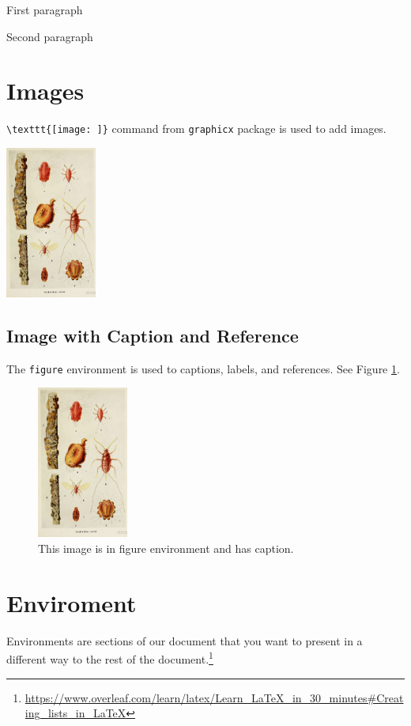 		First paragraph
		
		\noindent Second paragraph
		
\section{Images}

	\verb|\texttt{[image: ]}| command from \verb|graphicx| package is used to add images.
	
	\includegraphics[height=5cm]{./images/Kerria-Lacca}
	
	\subsection{Image with Caption and Reference}
	
		The \verb|figure| environment is used to captions, labels, and references. See Figure \ref{fig1}.
	
		\begin{figure}[h]
			\centering
			\includegraphics[height=5cm]{./images/Kerria-Lacca}
			\caption{This image is in figure environment and has caption.}
			\label{fig1}
		\end{figure}

\section{Enviroment}

	Environments are sections of our document that you want to present in a different way to the rest of the document.\footnote{\url{https://www.overleaf.com/learn/latex/Learn_LaTeX_in_30_minutes\#Creating_lists_in_LaTeX}}
	
